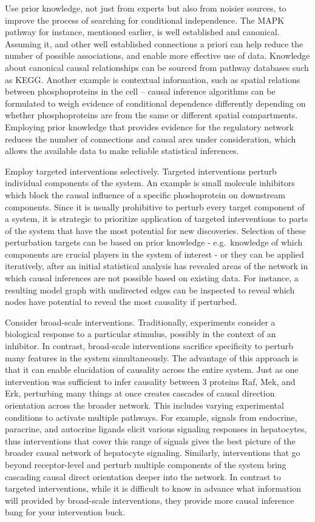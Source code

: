 \documentclass[]{article}
\begin{document}
Use prior knowledge, not just from experts but also from noisier
sources, to improve the process of searching for conditional
independence. The MAPK pathway for instance, mentioned earlier, is well
established and canonical. Assuming it, and other well established
connections a priori can help reduce the number of possible
associations, and enable more effective use of data. Knowledge about
canonical causal relationships can be sourced from pathway databases
such as KEGG. Another example is contextual information, such as spatial
relations between phosphoproteins in the cell -- causal inference
algorithms can be formulated to weigh evidence of conditional dependence
differently depending on whether phosphoproteins are from the same or
different spatial compartments. Employing prior knowledge that provides
evidence for the regulatory network reduces the number of connections
and causal arcs under consideration, which allows the available data to
make reliable statistical inferences.

Employ targeted interventions selectively. Targeted interventions
perturb individual components of the system. An example is small
molecule inhibitors which block the causal influence of a specific
phoshoprotein on downstream components. Since it is usually prohibitive
to perturb every target component of a system, it is strategic to
prioritize application of targeted interventions to parts of the system
that have the most potential for new discoveries. Selection of these
perturbation targets can be based on prior knowledge - e.g.~knowledge of
which components are crucial players in the system of interest - or they
can be applied iteratively, after an initial statistical analysis has
revealed areas of the network in which causal inferences are not
possible based on existing data. For instance, a resulting model graph
with undirected edges can be inspected to reveal which nodes have
potential to reveal the most causality if perturbed.

Consider broad-scale interventions. Traditionally, experiments consider
a biological response to a particular stimulus, possibly in the context
of an inhibitor. In contrast, broad-scale interventions sacrifice
specificity to perturb many features in the system simultaneously. The
advantage of this approach is that it can enable elucidation of
causality across the entire system. Just as one intervention was
sufficient to infer causality between 3 proteins Raf, Mek, and Erk,
perturbing many things at once creates cascades of causal direction
orientation across the broader network. This includes varying
experimental conditions to activate multiple pathways. For example,
signals from endocrine, paracrine, and autocrine ligands elicit various
signaling responses in hepatocytes, thus interventions that cover this
range of signals gives the best picture of the broader causal network of
hepatocyte signaling. Similarly, interventions that go beyond
receptor-level and perturb multiple components of the system bring
cascading causal direct orientation deeper into the network. In contrast
to targeted interventions, while it is difficult to know in advance what
information will provided by broad-scale interventions, they provide
more causal inference bang for your intervention buck.
\end{document}
